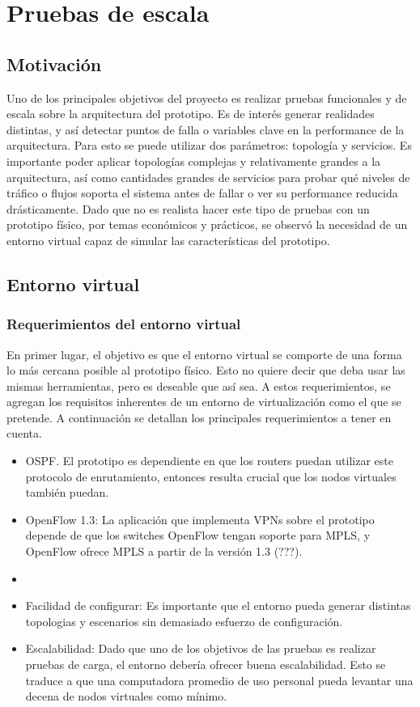 \documentclass[a4paper,12pt]{report}
\begin{document}
\tableofcontents
\chapter{Pruebas de escala}
\section{Motivación}
Uno de los principales objetivos del proyecto es realizar pruebas funcionales y de escala sobre la arquitectura del prototipo. Es de interés generar realidades distintas, y así detectar puntos de falla o variables clave en la performance de la arquitectura. Para esto se puede utilizar dos parámetros: topología y servicios. Es importante poder aplicar topologías complejas y relativamente grandes a la arquitectura, así como cantidades grandes de servicios para probar qué niveles de tráfico o flujos soporta el sistema antes de fallar o ver su performance reducida drásticamente. Dado que no es realista hacer este tipo de pruebas con un prototipo físico, por temas económicos y prácticos, se observó la necesidad de un entorno virtual capaz de simular las características del prototipo.

\section{Entorno virtual}
\subsection{Requerimientos del entorno virtual}
En primer lugar, el objetivo es que el entorno virtual se comporte de una forma lo más cercana posible al prototipo físico. Esto no quiere decir que deba usar las mismas herramientas, pero es deseable que así sea. A estos requerimientos, se agregan los requisitos inherentes de un entorno de virtualización como el que se pretende. A continuación se detallan los principales requerimientos a tener en cuenta.
\begin{itemize} 
	\item OSPF. El prototipo es dependiente en que los routers puedan utilizar este protocolo de enrutamiento, entonces resulta crucial que los nodos virtuales también puedan.
	\item OpenFlow 1.3: La aplicación que implementa VPNs sobre el prototipo depende de que los switches OpenFlow tengan soporte para MPLS, y OpenFlow ofrece MPLS a partir de la versión 1.3 (???).
	\item 
	\item Facilidad de configurar: Es importante que el entorno pueda generar distintas topologias y escenarios sin demasiado esfuerzo de configuración.
	\item Escalabilidad: Dado que uno de los objetivos de las pruebas es realizar pruebas de carga, el entorno debería ofrecer buena escalabilidad. Esto se traduce a que una computadora promedio de uso personal pueda levantar una decena de nodos virtuales como mínimo.
\end{itemize}
\end{document}
